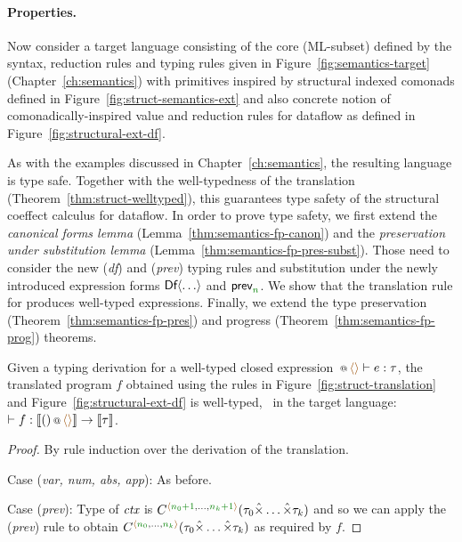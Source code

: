\paragraph{Properties.}

Now consider a target language consisting of the core (ML-subset) defined by the syntax,
reduction rules and typing rules given in Figure~\ref{fig:semantics-target} (Chapter~\ref{ch:semantics})
with primitives inspired by structural indexed comonads defined in Figure~\ref{fig:struct-semantics-ext}
and also concrete notion of comonadically-inspired value and reduction rules for dataflow as
defined in Figure~\ref{fig:structural-ext-df}.

As with the examples discussed in Chapter~\ref{ch:semantics}, the resulting language is type safe.
Together with the well-typedness of the translation (Theorem~\ref{thm:struct-welltyped}), this
guarantees type safety of the structural coeffect calculus for dataflow.
In order to prove type safety, we first extend the \emph{canonical forms lemma}
(Lemma~\ref{thm:semantics-fp-canon}) and the \emph{preservation under substitution lemma}
(Lemma~\ref{thm:semantics-fp-pres-subst}). Those need to consider the new (\emph{df})
and (\emph{prev}) typing rules and substitution under the newly introduced expression forms
$\textnormal{\sffamily Df}\langle\ldots\rangle$ and $\ident{prev}_{\cclrd{n}}$. We show that the translation
rule for  produces well-typed expressions. Finally, we extend the type preservation
(Theorem~\ref{thm:semantics-fp-pres}) and progress (Theorem~\ref{thm:semantics-fp-prog}) theorems.

\begin{theorem}
\label{thm:structural-df-welltyped}
Given a typing derivation for a well-typed closed expression $\coctx{}{\alift{}} \vdash e : \tau$,
the translated program $f$ obtained using the rules in Figure~\ref{fig:struct-translation}
and Figure~\ref{fig:structural-ext-df} is well-typed, \ie~in the target language: $\vdash f : \sem{\coctx{()}{\alift{}}} \rightarrow \sem{\tau}$.
\end{theorem}
\begin{proof}
By rule induction over the derivation of the translation.

\vspace{0.5em}\noindent\hangindent=0.6cm
Case (\emph{var, num, abs, app}): As before.

\vspace{0.5em}\noindent\hangindent=0.6cm
Case (\emph{prev}): Type of $\textit{ctx}$ is $\ctyp{\alift{\cclrd{n_0+1},\ldots,\cclrd{n_k+1}}}{(\tau_0\xtimes\ldots\xtimes\tau_k)}$
  and so we can apply the (\emph{prev}) rule to obtain $\ctyp{\alift{\cclrd{n_0},\ldots,\cclrd{n_k}}}{(\tau_0\xtimes\ldots\xtimes\tau_k)}$
  as required by $f$.
\end{proof}

